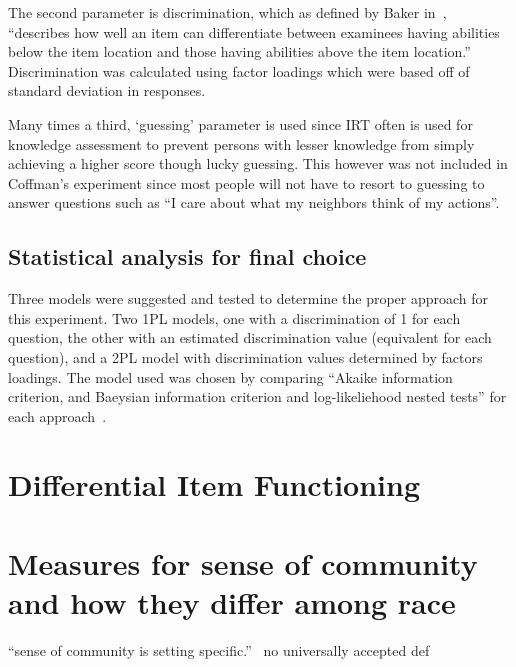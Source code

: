 \documentclass{sig-alternate}
\begin{document}
The second parameter is discrimination, which as defined by Baker in~\cite{irt:2001}, ``describes how well an item can differentiate between examinees having abilities below the item location and those having abilities above the item location.'' Discrimination was calculated using factor loadings which were based off of standard deviation in responses.

Many times a third, `guessing' parameter is used since IRT often is used for knowledge assessment to prevent persons with lesser knowledge from simply achieving a higher score though lucky guessing. This however was not included in Coffman's experiment since most people will not have to resort to guessing to answer questions such as ``I care about what my neighbors think of my actions''.

\subsection{Statistical analysis for final choice}
Three models were suggested and tested to determine the proper approach for this experiment. Two 1PL models, one with a discrimination of 1 for each question, the other with an estimated discrimination value (equivalent for each question), and a 2PL model with discrimination values determined by factors loadings. The model used was chosen by comparing ``Akaike information criterion, and Baeysian information criterion and log-likeliehood nested tests'' for each approach~\cite{disparities:2009}.

\section{Differential Item Functioning}








\section{Measures for sense of community and how they differ among race}






``sense of
community is setting specific.''~\cite{cognitiveLearning:2002}
no universally accepted def
\end{document}
